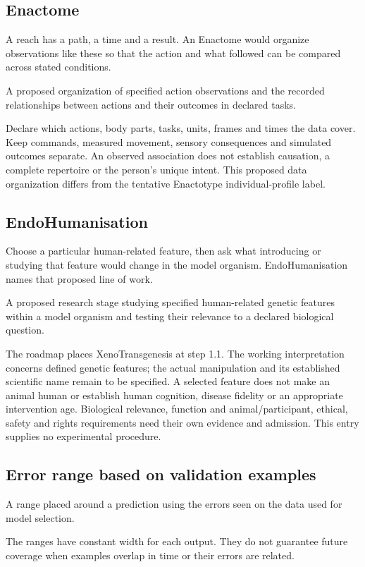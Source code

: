 \subsection*{Enactome}
\noindent A reach has a path, a time and a result. An Enactome would organize observations like these so that the action and what followed can be compared across stated conditions.\par
\noindent A proposed organization of specified action observations and the recorded relationships between actions and their outcomes in declared tasks.\par
\noindent Declare which actions, body parts, tasks, units, frames and times the data cover. Keep commands, measured movement, sensory consequences and simulated outcomes separate. An observed association does not establish causation, a complete repertoire or the person’s unique intent. This proposed data organization differs from the tentative Enactotype individual-profile label.\par

\subsection*{EndoHumanisation}
\noindent Choose a particular human-related feature, then ask what introducing or studying that feature would change in the model organism. EndoHumanisation names that proposed line of work.\par
\noindent A proposed research stage studying specified human-related genetic features within a model organism and testing their relevance to a declared biological question.\par
\noindent The roadmap places XenoTransgenesis at step 1.1. The working interpretation concerns defined genetic features; the actual manipulation and its established scientific name remain to be specified. A selected feature does not make an animal human or establish human cognition, disease fidelity or an appropriate intervention age. Biological relevance, function and animal/participant, ethical, safety and rights requirements need their own evidence and admission. This entry supplies no experimental procedure.\par

\begin{samepage}
\subsection*{Error range based on validation examples}
\noindent A range placed around a prediction using the errors seen on the data used for model selection.\par
\end{samepage}
\begin{samepage}
\noindent The ranges have constant width for each output. They do not guarantee future coverage when examples overlap in time or their errors are related.\par\nopagebreak[4]

\end{samepage}


